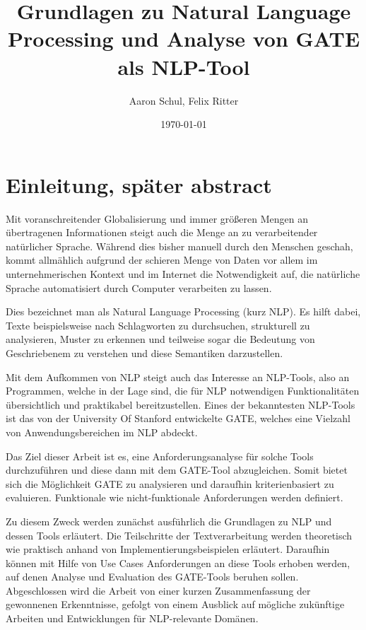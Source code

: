 \documentclass[12pt]{report}
\begin{document}
\title{Grundlagen zu Natural Language Processing und Analyse von GATE als NLP-Tool}
\author{Aaron Schul, Felix Ritter}
\date{\today}
\maketitle

\newpage
\tableofcontents
\newpage
\listoftables
\listoffigures

\newpage
\section{Einleitung, später abstract}
Mit voranschreitender Globalisierung und immer größeren Mengen an übertragenen Informationen steigt auch die Menge an zu verarbeitender natürlicher Sprache. Während dies bisher manuell durch den Menschen geschah, kommt allmählich aufgrund der schieren Menge von Daten vor allem im unternehmerischen Kontext und im Internet die Notwendigkeit auf, die natürliche Sprache automatisiert durch Computer verarbeiten zu lassen.

Dies bezeichnet man als Natural Language Processing (kurz NLP). Es hilft dabei, Texte beispielsweise nach Schlagworten zu durchsuchen, strukturell zu analysieren, Muster zu erkennen und teilweise sogar die Bedeutung von Geschriebenem zu verstehen und diese Semantiken darzustellen.

Mit dem Aufkommen von NLP steigt auch das Interesse an NLP-Tools, also an Programmen, welche in der Lage sind, die für NLP notwendigen Funktionalitäten übersichtlich und praktikabel bereitzustellen. Eines der bekanntesten NLP-Tools ist das von der University Of Stanford entwickelte GATE, welches eine Vielzahl von Anwendungsbereichen im NLP abdeckt.

Das Ziel dieser Arbeit ist es, eine Anforderungsanalyse für solche Tools durchzuführen und diese dann mit dem GATE-Tool abzugleichen. Somit bietet sich die Möglichkeit GATE zu analysieren und daraufhin kriterienbasiert zu evaluieren. Funktionale wie nicht-funktionale Anforderungen werden definiert.

Zu diesem Zweck werden zunächst ausführlich die Grundlagen zu NLP und dessen Tools erläutert. Die Teilschritte der Textverarbeitung werden theoretisch wie praktisch anhand von Implementierungsbeispielen erläutert. Daraufhin können mit Hilfe von Use Cases Anforderungen an diese Tools erhoben werden, auf denen Analyse und Evaluation des GATE-Tools beruhen sollen. Abgeschlossen wird die Arbeit von einer kurzen Zusammenfassung der gewonnenen Erkenntnisse, gefolgt von einem Ausblick auf mögliche zukünftige Arbeiten und Entwicklungen für NLP-relevante Domänen. 
\newpage
\end{document}
